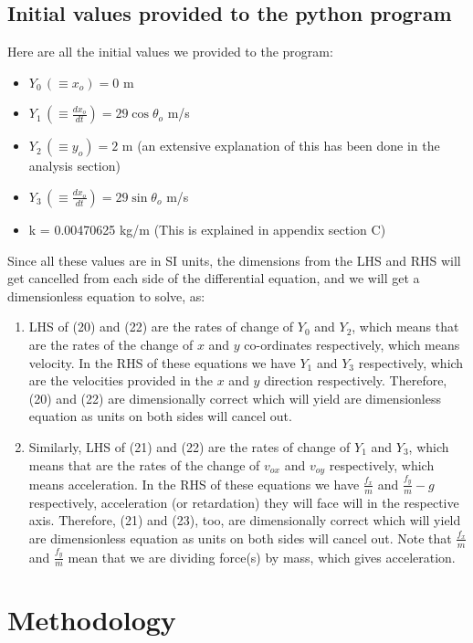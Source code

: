 \documentclass[12pt]{article}
\begin{document}
\subsection{Initial values provided to the python program}
Here are all the initial values we provided to the program:
\begin{itemize}
    \item $Y_0 \,(\equiv x_o) = 0$ m
    \item $Y_1 \,(\equiv \frac{dx_o}{dt}) = 29\cos\theta_o$ m/s \cite{ref11}
    \item $Y_2 \,(\equiv y_o) = 2$ m (an extensive explanation of this has been done in the analysis section)
    \item $Y_3 \,(\equiv \frac{dx_o}{dt}) = 29\sin\theta_o$ m/s \cite{ref12}
    \item k = 0.00470625 kg/m (This is explained in appendix section C)
\end{itemize}
Since all these values are in SI units, the dimensions from the LHS and RHS will get cancelled from each side of the differential equation, and we will get a dimensionless equation to solve, as:
\begin{enumerate}
    \item LHS of (20) and (22) are the rates of change of $Y_0$ and $Y_2$, which means that are the rates of the change of $x$ and $y$ co-ordinates respectively, which means velocity. In the RHS of these equations we have  $Y_1$ and  $Y_3$ respectively, which are the velocities provided in the $x$ and $y$ direction respectively. Therefore, (20) and (22) are dimensionally correct which will yield are dimensionless equation as units on both sides will cancel out.
    \item Similarly, LHS of (21) and (22) are the rates of change of $Y_1$ and $Y_3$, which means that are the rates of the change of $v_{ox}$ and $v_{oy}$ respectively, which means acceleration. In the RHS of these equations we have  $\frac{f_x}{m}$ and  $\frac{f_y}{m} - g$ respectively, acceleration (or retardation) they will face will in the respective axis. Therefore, (21) and (23), too, are dimensionally correct which will yield are dimensionless equation as units on both sides will cancel out. Note that $\frac{f_x}{m}$ and  $\frac{f_y}{m}$ mean that we are dividing force(s) by mass, which gives acceleration.
\end{enumerate}
\newpage
\section{Methodology}
\label{sec:method}
\end{document}
